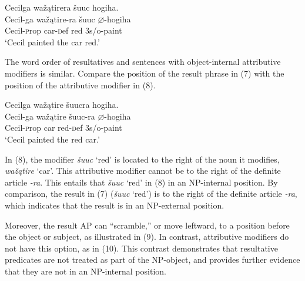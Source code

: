 \documentclass[output=paper]{LSP/langsci}
\begin{document}
\begin{exe}

\ex \glll Cecilga wa\v{z}\k{a}tirera \v{s}uuc hogiha. \\
Cecil-ga  wa\v{z}\k{a}tire-ra \v{s}uuc $\varnothing$-hogiha \\
Cecil-{\textsc prop} car-{\textsc def} red {\textsc 3s/o}-paint\\
\glt `Cecil painted the car red.'

\end{exe}

The word order of resultatives and sentences with object-internal attributive modifiers is similar. Compare the position of the result phrase in (7) with the position of the attributive modifier in (8).

\begin{exe}

\ex \glll Cecilga wa\v{z}\k{a}tire \v{s}uucra hogiha. \\
Cecil-ga  wa\v{z}\k{a}tire \v{s}uuc-ra  $\varnothing$-hogiha\\
Cecil-{\textsc prop} car red-{\textsc def}  {\textsc 3s/o}-paint\\
\glt `Cecil painted the red car.'

\end{exe}

In (8), the modifier \textit{\v{s}uuc} `red' is located to the right of the noun it modifies, \textit{wa\v{z}\k{a}tire} `car'. This attributive modifier cannot be to the right of the definite article \textit{-ra}. This entails that \textit{\v{s}uuc} `red' in (8) in an NP-internal position. By comparison, the result in (7) (\textit{\v{s}uuc} `red') is to the right of the definite article \textit{-ra}, which indicates that the result is in an NP-external position.

Moreover, the result AP can ``scramble,'' or move leftward, to a position before the object or subject, as illustrated in (9). In contrast, attributive modifiers do not have this option, as in (10). This contrast demonstrates that resultative predicates are not treated as part of the NP-object, and provides further evidence that they are not in an NP-internal position.
\end{document}
